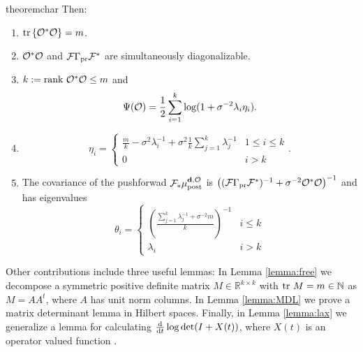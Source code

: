 \begin{restatable}{theorem}{char}
  Then:
  \begin{enumerate}
  \item  $\textup{tr}\left \{\mathcal{O}^*\mathcal{O} \right \} = m$.
  \item $\mathcal{O}^*\mathcal{O}$ and $\mathcal{F}\Gamma_{\textup{pr}}\mathcal{F}^*$ are simultaneously
    diagonalizable.
  \item $k := \textup{rank}\  \mathcal{O}^*\mathcal{O} \leq m$ and
    \begin{equation*}
      \tar(\obs) = \frac12 \sum_{i=1}^{k} \log (1 + \sigma^{-2}\lambda_i\eta_i). %
    \end{equation*}
  \item
    \begin{equation*}
        \eta_i = \begin{cases}
          \frac{m}{k} - \sigma^2 \lambda_i^{-1} + \sigma^2 \frac{1}{k} \sum_{j=1}^k \lambda_j^{-1} & 1 \leq i \leq k \\
          0 & i > k 
        \end{cases}.
    \end{equation*}
  \item The covariance of the pushforwad $\mathcal{F}_{*} \mu_{\textup{post}}^{\mathbf{d}, \mathcal{O}}$ is $\left (
    (\mathcal{F} \Gamma_{\textup{pr}} \mathcal{F}^*)^{-1} + \sigma^{-2} \mathcal{O}^*\mathcal{O} \right )^{-1}$
    and has eigenvalues
    \begin{equation*}
      \theta_i =
      \begin{cases}
        \left(\frac{\sum_{j=1}^k \lambda_j^{-1} + \sigma^{-2}m}{k} \right )^{-1} & i \leq k \\
        \lambda_i &  i > k 
      \end{cases}
    \end{equation*}
  \end{enumerate}
\end{restatable}

Other contributions include three useful lemmas: In Lemma
\ref{lemma:free} we decompose a symmetric positive definite matrix $M
\in \mathbb{R}^{k \times k}$ with $\textup{tr}\ M = m \in \mathbb{N}$ as $M =
AA^t$, where $A$ has unit norm columns. In Lemma \ref{lemma:MDL} we
prove a matrix determinant lemma in Hilbert spaces. Finally, in Lemma
\ref{lemma:lax} we generalize a lemma for calculating
$\frac{\text{\textup{d}}}{\text{\textup{d}} t} \log \det (I + X(t))$, where $X(t)$ is an
operator valued function \cite{Lax07}.



